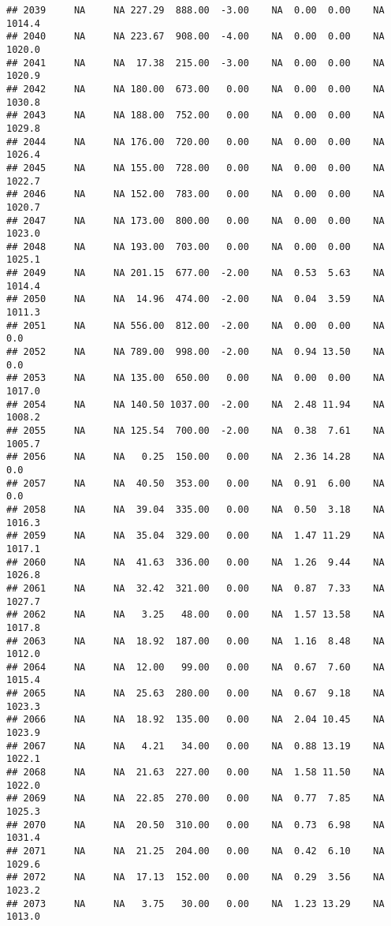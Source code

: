 \documentclass{article}\usepackage{graphicx, color}
\makeatletter
\newenvironment{kframe}{%
 \def\at@end@of@kframe{}%
 \ifinner\ifhmode%
  \def\at@end@of@kframe{\end{minipage}}%
  \begin{minipage}{\columnwidth}%
 \fi\fi%
 \def\FrameCommand##1{\hskip\@totalleftmargin \hskip-\fboxsep
 \colorbox{shadecolor}{##1}\hskip-\fboxsep
     \hskip-\linewidth \hskip-\@totalleftmargin \hskip\columnwidth}%
 \MakeFramed {\advance\hsize-\width
   \@totalleftmargin\z@ \linewidth\hsize
   \@setminipage}}%
 {\par\unskip\endMakeFramed%
 \at@end@of@kframe}
\newenvironment{knitrout}{}{} %
\makeatother
\begin{document}
\begin{knitrout}
\begin{kframe}
\begin{verbatim}
## 2039     NA     NA 227.29  888.00  -3.00    NA  0.00  0.00    NA 1014.4
## 2040     NA     NA 223.67  908.00  -4.00    NA  0.00  0.00    NA 1020.0
## 2041     NA     NA  17.38  215.00  -3.00    NA  0.00  0.00    NA 1020.9
## 2042     NA     NA 180.00  673.00   0.00    NA  0.00  0.00    NA 1030.8
## 2043     NA     NA 188.00  752.00   0.00    NA  0.00  0.00    NA 1029.8
## 2044     NA     NA 176.00  720.00   0.00    NA  0.00  0.00    NA 1026.4
## 2045     NA     NA 155.00  728.00   0.00    NA  0.00  0.00    NA 1022.7
## 2046     NA     NA 152.00  783.00   0.00    NA  0.00  0.00    NA 1020.7
## 2047     NA     NA 173.00  800.00   0.00    NA  0.00  0.00    NA 1023.0
## 2048     NA     NA 193.00  703.00   0.00    NA  0.00  0.00    NA 1025.1
## 2049     NA     NA 201.15  677.00  -2.00    NA  0.53  5.63    NA 1014.4
## 2050     NA     NA  14.96  474.00  -2.00    NA  0.04  3.59    NA 1011.3
## 2051     NA     NA 556.00  812.00  -2.00    NA  0.00  0.00    NA    0.0
## 2052     NA     NA 789.00  998.00  -2.00    NA  0.94 13.50    NA    0.0
## 2053     NA     NA 135.00  650.00   0.00    NA  0.00  0.00    NA 1017.0
## 2054     NA     NA 140.50 1037.00  -2.00    NA  2.48 11.94    NA 1008.2
## 2055     NA     NA 125.54  700.00  -2.00    NA  0.38  7.61    NA 1005.7
## 2056     NA     NA   0.25  150.00   0.00    NA  2.36 14.28    NA    0.0
## 2057     NA     NA  40.50  353.00   0.00    NA  0.91  6.00    NA    0.0
## 2058     NA     NA  39.04  335.00   0.00    NA  0.50  3.18    NA 1016.3
## 2059     NA     NA  35.04  329.00   0.00    NA  1.47 11.29    NA 1017.1
## 2060     NA     NA  41.63  336.00   0.00    NA  1.26  9.44    NA 1026.8
## 2061     NA     NA  32.42  321.00   0.00    NA  0.87  7.33    NA 1027.7
## 2062     NA     NA   3.25   48.00   0.00    NA  1.57 13.58    NA 1017.8
## 2063     NA     NA  18.92  187.00   0.00    NA  1.16  8.48    NA 1012.0
## 2064     NA     NA  12.00   99.00   0.00    NA  0.67  7.60    NA 1015.4
## 2065     NA     NA  25.63  280.00   0.00    NA  0.67  9.18    NA 1023.3
## 2066     NA     NA  18.92  135.00   0.00    NA  2.04 10.45    NA 1023.9
## 2067     NA     NA   4.21   34.00   0.00    NA  0.88 13.19    NA 1022.1
## 2068     NA     NA  21.63  227.00   0.00    NA  1.58 11.50    NA 1022.0
## 2069     NA     NA  22.85  270.00   0.00    NA  0.77  7.85    NA 1025.3
## 2070     NA     NA  20.50  310.00   0.00    NA  0.73  6.98    NA 1031.4
## 2071     NA     NA  21.25  204.00   0.00    NA  0.42  6.10    NA 1029.6
## 2072     NA     NA  17.13  152.00   0.00    NA  0.29  3.56    NA 1023.2
## 2073     NA     NA   3.75   30.00   0.00    NA  1.23 13.29    NA 1013.0

\end{verbatim}
\end{kframe}
\end{knitrout}
\end{document}
